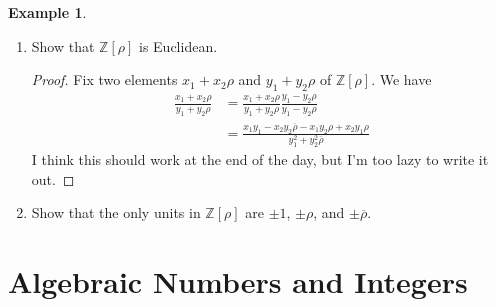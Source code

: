 \documentclass[a4paper]{book}
\theoremstyle{definition}
\newtheorem{example}{Example}[definition]
\begin{document}
\begin{example}
    \begin{enumerate}
        \item Show that \(\mathbb{Z}[\rho]\) is Euclidean.
        \begin{proof}
            Fix two elements \(x_1 + x_2 \rho\) and \(y_1 + y_2 \rho\) of \(\mathbb{Z}[\rho]\). We have
            \begin{align*}
                \frac{x_1 + x_2 \rho}{y_1 + y_2 \rho} &= \frac{x_1 + x_2 \rho}{y_1 + y_2 \rho} \frac{y_1 - y_2 \rho}{y_1 - y_2 \rho} \\
                &= \frac{x_1 y_1 - x_2 y_2 \overline{\rho}  - x_1 y_2 \rho + x_2 y_1 \rho}{y_1^2 + y_2^2 \overline{\rho}}
            \end{align*}
            I think this should work at the end of the day, but I'm too lazy to write it out.
        \end{proof}
        \item Show that the only units in \(\mathbb{Z}[\rho]\) are \(\pm 1\), \(\pm \rho\), and \(\pm \overline{\rho}\).
    \end{enumerate}
\end{example}

\chapter{Algebraic Numbers and Integers}
\end{document}
